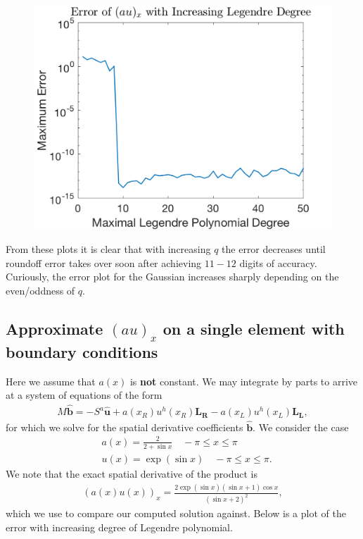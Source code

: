 \documentclass{article}
\begin{document}
\begin{figure}[H]
\begin{minipage}{.4\textwidth}
    \includegraphics[width=\linewidth]{plots/x_8.png}
    \label{fig:eight}
  \end{minipage}%
\end{figure}
\noindent From these plots it is clear that with increasing $q$ the error decreases until roundoff error takes over soon after achieving $11-12$ digits of accuracy. Curiously, the error plot for the Gaussian increases sharply depending on the even/oddness of $q$.

\subsection{Approximate $\left( a u\right)_x $ on a single element with boundary conditions}
Here we assume that $a(x)$ is \textbf{not} constant. We may integrate by parts to arrive at a system of equations of the form
	\begin{align*}
		M \boldsymbol{\hat{b}} = -S^a \boldsymbol{\hat{u}} + a(x_R)u^h(x_R)\boldsymbol{L_R} - a(x_L)u^h(x_L)\boldsymbol{L_L},
	\end{align*}
for which we solve for the spatial derivative coefficients $\boldsymbol{\hat{b}}$. We consider the case 
	\begin{align*}
		& a(x) = \frac{2}{2 + \sin x} \quad -\pi \leq x \leq \pi \\
		& u(x) = \exp(\sin x) \quad -\pi \leq x \leq \pi.
	\end{align*}
We note that the exact spatial derivative of the product is 
	\begin{align*}
		(a(x)u(x))_x = \frac{2 \exp(\sin x) (\sin x + 1) \cos x}{(\sin x + 2)^2},
	\end{align*}
which we use to compare our computed solution against. Below is a plot of the error with increasing degree of Legendre polynomial.
\end{document}
